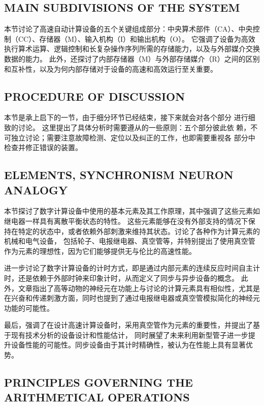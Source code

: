 \documentclass[12pt]{article} %
\theoremstyle{definition}
\begin{document}
\subsection{MAIN SUBDIVISIONS OF THE SYSTEM}

本节讨论了高速自动计算设备的五个关键组成部分：中央算术部件（CA）、中央控制（CC）、存储器（M）、输入机构（I）和输出机构（O）。
它强调了设备为高效执行算术运算、逻辑控制和长复杂操作序列所需的存储能力，以及与外部媒介交换数据的能力。
此外，还探讨了内部存储器（M）与外部存储媒介（R）之间的区别和互补性，以及为何内部存储对于设备的高速和高效运行至关重要。

\subsection{PROCEDURE OF DISCUSSION}

本节是承上启下的一节，由于细分环节已经结束，接下来就会对各个部分
进行细致的讨论。
这里提出了具体分析时需要遵从的一些原则：五个部分彼此依
赖，不可独立讨论；需要注意故障检测、定位以及纠正的工作，也即需要重视各
部分中检查并修正错误的装置。

\subsection{ELEMENTS, SYNCHRONISM NEURON ANALOGY}

本节探讨了数字计算设备中使用的基本元素及其工作原理，其中强调了这些元素如继电器一样具有离散平衡状态的特性。
这些元素能够在没有外部支持的情况下保持在特定的状态中，或者依赖外部刺激来维持其状态。讨论了各种作为计算元素的机械和电气设备，
包括轮子、电报继电器、真空管等，并特别提出了使用真空管作为元素的理想性，因为它们能够提供无与伦比的高速性能。

进一步讨论了数字计算设备的计时方式，即是通过内部元素的连续反应时间自主计时，还是依赖于外部时钟来印象计时，从而定义了同步与异步设备的概念。
此外，文章指出了高等动物的神经元在功能上与讨论的计算元素具有相似性，尤其是在兴奋和传递刺激方面，同时也提到了通过电报继电器或真空管模拟简化的神经元功能的可能性。

最后，强调了在设计高速计算设备时，采用真空管作为元素的重要性，并提出了基于现有技术分析的设备设计和性能估计，
同时展望了未来利用新型管子进一步提升设备性能的可能性。同步设备由于其计时精确性，被认为在性能上具有显著优势。

\subsection{PRINCIPLES GOVERNING THE ARITHMETICAL OPERATIONS}
\end{document}
